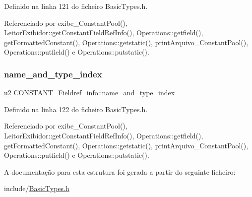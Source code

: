 Definido na linha 121 do ficheiro Basic\+Types.\+h.



Referenciado por exibe\+\_\+\+Constant\+Pool(), Leitor\+Exibidor\+::get\+Constant\+Field\+Ref\+Info(), Operations\+::getfield(), get\+Formatted\+Constant(), Operations\+::getstatic(), print\+Arquivo\+\_\+\+Constant\+Pool(), Operations\+::putfield() e Operations\+::putstatic().

\mbox{\label{structCONSTANT__Fieldref__info_a9ccfe931ed030cef53ca1b079356fe31}} 
\subsubsection{\texorpdfstring{name\+\_\+and\+\_\+type\+\_\+index}{name\_and\_type\_index}}
{\footnotesize\ttfamily \hyperlink{BasicTypes_8h_a732cde1300aafb73b0ea6c2558a7a54f}{u2} C\+O\+N\+S\+T\+A\+N\+T\+\_\+\+Fieldref\+\_\+info\+::name\+\_\+and\+\_\+type\+\_\+index}



Definido na linha 122 do ficheiro Basic\+Types.\+h.



Referenciado por exibe\+\_\+\+Constant\+Pool(), Leitor\+Exibidor\+::get\+Constant\+Field\+Ref\+Info(), Operations\+::getfield(), get\+Formatted\+Constant(), Operations\+::getstatic(), print\+Arquivo\+\_\+\+Constant\+Pool(), Operations\+::putfield() e Operations\+::putstatic().



A documentação para esta estrutura foi gerada a partir do seguinte ficheiro\+:\begin{DoxyCompactItemize}
\item 
include/\hyperlink{BasicTypes_8h}{Basic\+Types.\+h}\end{DoxyCompactItemize}
